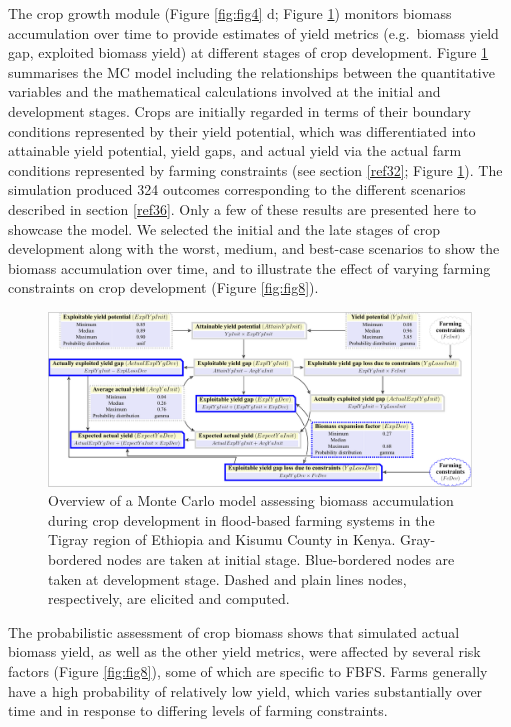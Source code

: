 \documentclass[]{elsarticle} %
\begin{document}
The crop growth module (Figure \ref{fig:fig4} d; Figure \ref{fig:fig7}) monitors biomass accumulation over time to provide estimates of yield metrics (e.g.~biomass yield gap, exploited biomass yield) at different stages of crop development. Figure \ref{fig:fig7} summarises the MC model including the relationships between the quantitative variables and the mathematical calculations involved at the initial and development stages. Crops are initially regarded in terms of their boundary conditions represented by their yield potential, which was differentiated into attainable yield potential, yield gaps, and actual yield via the actual farm conditions represented by farming constraints (see section \ref{ref32}; Figure \ref{fig:fig7}). The simulation produced 324 outcomes corresponding to the different scenarios described in section \ref{ref36}. Only a few of these results are presented here to showcase the model. We selected the initial and the late stages of crop development along with the worst, medium, and best-case scenarios to show the biomass accumulation over time, and to illustrate the effect of varying farming constraints on crop development (Figure \ref{fig:fig8}).

\begin{figure}[!h]

{\centering \includegraphics[width=1\linewidth,]{Modelling_FBFS_files/figure-latex/fig7-plot-1} 

}

\caption{Overview of a Monte Carlo model assessing biomass accumulation during crop development in flood-based farming systems in the Tigray region of Ethiopia and Kisumu County in Kenya. Gray-bordered nodes are taken at initial stage. Blue-bordered nodes are taken at development stage. Dashed and plain lines nodes, respectively, are elicited and computed.}\label{fig:fig7}
\end{figure}

The probabilistic assessment of crop biomass shows that simulated actual biomass yield, as well as the other yield metrics, were affected by several risk factors (Figure \ref{fig:fig8}), some of which are specific to FBFS. Farms generally have a high probability of relatively low yield, which varies substantially over time and in response to differing levels of farming constraints.
\end{document}
